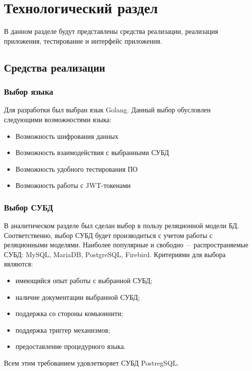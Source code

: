 \chapter{Технологический раздел}


В данном разделе будут представлены средства реализации, реализация приложения, тестирование и интерфейс приложения.


\section{Средства реализации}
\subsection{Выбор языка}
Для разработки был выбран язык Golang. Данный выбор обусловлен следующими возможностями языка:
\begin{itemize}
	\item Возможность шифрования данных \cite{golang_crypt}
	\item Возможность взаимодействия с выбранными СУБД \cite{golang_dbms}
	\item Возможность удобного тестирования ПО \cite{golang_testing}
	\item Возможность работы с JWT-токенами \cite{golang_jwt}
\end{itemize}

\subsection{Выбор СУБД}
В аналитическом разделе был сделан выбор в пользу реляционной модели БД.
Соответственно, выбор СУБД будет производиться с учетом работы с реляционными моделями.
Наиболее популярные и свободно~--~распространяемые СУБД: MySQL, MariaDB, PostgreSQL, Firebird.
Критериями для выбора являются:
\begin{itemize}
	\item имеющийся опыт работы с выбранной СУБД;
	\item наличие документации выбранной СУБД;
	\item поддержка со стороны комьюинити;
	\item поддержка триггер механизмов;
	\item предоставление процедурного языка.
\end{itemize}

Всем этим требованием удовлетворяет СУБД PostregSQL.


